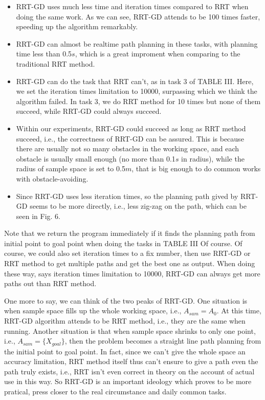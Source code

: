 \documentclass[letterpaper, 10 pt, conference]{ieeeconf}  %
\begin{document}
\begin{itemize}

\item RRT-GD uses much less time and iteration times compared to RRT when doing the same work. As we can see, RRT-GD attends to be 100 times faster, speeding up the algorithm remarkably.
\item RRT-GD can almost be realtime path planning in these tasks, with planning time less than 0.5$s$, which is a great improment when comparing to the traditional RRT method.
\item RRT-GD can do the task that RRT can't, as in task 3 of TABLE III. Here, we set the iteration times limitation to 10000,  surpassing which we think the algorithm failed. In task 3, we do RRT method for 10 times but none of them succeed, while RRT-GD could always succeed.
\item Within our experiments, RRT-GD could succeed as long as RRT method succeed, i.e., the correctness of RRT-GD can be assured. This is because there are usually not so many obstacles in the working space, and each obstacle is usually small enough (no more than 0.1$s$ in radius), while the radius of sample space is set to 0.5$m$, that is big enough to do common works with obstacle-avoiding.
\item Since RRT-GD uses less iteration times, so the planning path gived by RRT-GD seems to be more directly, i.e., less zig-zag on the path, which can be seen in Fig. 6.

\end{itemize}

Note that we return the program immediately if it finds the planning path from initial point to goal point when doing the tasks in TABLE III Of course. Of course, we could also set iteration times to a fix number, then use RRT-GD or RRT method to get multiple paths and get the best one as output. When doing these way, says iteration times limitation to 10000, RRT-GD can always get more paths out than RRT method.

One more to say, we can think of the two peaks of RRT-GD. One situation is when sample space fills up the whole working space, i.e., $A_{sam} = A_{0}$. At this time, RRT-GD algorithm attends to be RRT method, i.e., they are the same when running. Another situation is that when sample space shrinks to only one point, i.e., $A_{sam} = \{X_{goal}\}$, then the problem becomes a straight line path planning from the initial point to goal point. In fact, since we can't give the whole space an accuracy limitation, RRT method itself thus can't ensure to give a path even the path truly exists, i.e., RRT isn't even correct in theory on the account of actual use in this way. So RRT-GD is an important ideology which proves to be more pratical, press closer to the real circumstance and daily common tasks. 
\end{document}
